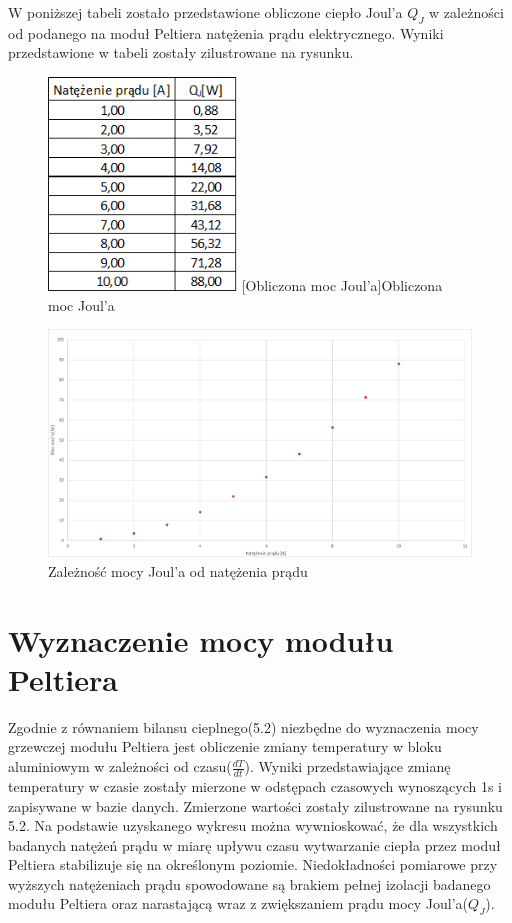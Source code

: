 \documentclass[oneside]{mgr}
\begin{document}
\newpage
W poniższej tabeli zostało przedstawione obliczone ciepło Joul'a $Q_J$ w zależności od podanego na moduł Peltiera natężenia prądu elektrycznego. Wyniki przedstawione w tabeli zostały zilustrowane na rysunku.
\begin{center}
\begin{figure}[h!]
    \centering
    \includegraphics[width=5cm]{QJ_dane.png}
    [Obliczona moc Joul'a]{Obliczona moc Joul'a}
    \end{figure}
\end{center}
\begin{center}
\begin{figure}[h!]
    \centering
    \includegraphics[width=\textwidth]{QJ_wykres.png}
    \caption{Zależność mocy Joul'a od natężenia prądu}
    \end{figure}
\end{center}
\newpage
\section{Wyznaczenie mocy modułu Peltiera}
Zgodnie z równaniem bilansu cieplnego(5.2) niezbędne do wyznaczenia mocy grzewczej modułu Peltiera jest obliczenie zmiany temperatury w bloku aluminiowym w zależności od czasu($\frac{dT}{dt}$). Wyniki przedstawiające zmianę temperatury w czasie zostały mierzone w odstępach czasowych wynoszących 1s i zapisywane w bazie danych. Zmierzone wartości zostały zilustrowane na rysunku 5.2. Na podstawie uzyskanego wykresu można wywnioskować, że dla wszystkich badanych natężeń prądu w miarę upływu czasu wytwarzanie ciepła przez moduł Peltiera stabilizuje się na określonym poziomie. Niedokładności pomiarowe przy wyższych natężeniach prądu spowodowane są brakiem pełnej izolacji badanego modułu Peltiera oraz narastającą wraz z zwiększaniem prądu mocy Joul'a($Q_J$).
\end{document}
